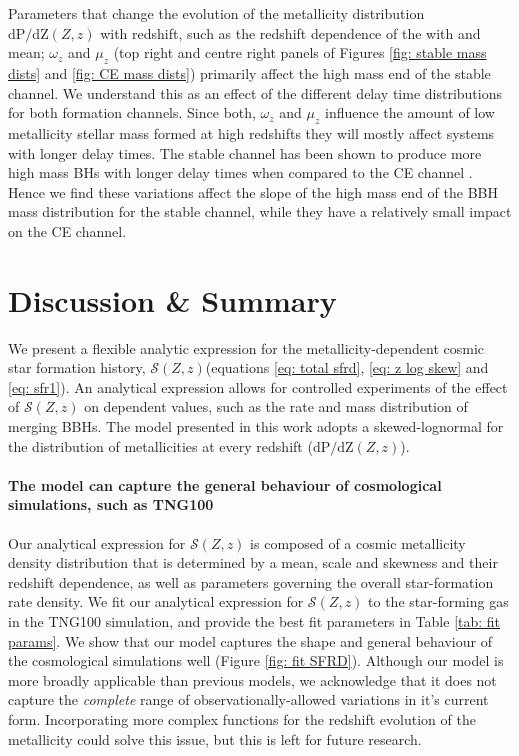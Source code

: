 \documentclass[twocolumn]{aastex631}
\newcommand{\SFRDzZ}{\ensuremath{\mathcal{S}(Z,z)}\xspace}
\newcommand{\dpdZ}{\ensuremath{\mathrm{dP/dZ}(Z,z)}\xspace}
\begin{document}
Parameters that change the evolution of the metallicity distribution \dpdZ with redshift, such as the redshift dependence of the with and mean; $\omega_z$ and $\mu_z$ (top right and centre right panels of Figures \ref{fig: stable mass dists} and \ref{fig: CE mass dists}) primarily affect the high mass end of the stable channel. 
We understand this as an effect of the different delay time distributions for both formation channels. Since both, $\omega_z$ and $\mu_z$ influence the amount of low metallicity stellar mass formed at high redshifts they will mostly affect systems with longer delay times. The stable channel has been shown to produce more high mass BHs with longer delay times when compared to the CE channel \citep{vanson+2022, Briel+2022}. 
Hence we find these variations affect the slope of the high mass end of the BBH mass distribution for the stable channel, while they have a relatively small impact on the CE channel.



\section{Discussion \& Summary \label{sec: summary}}
We present a flexible analytic expression for the metallicity-dependent cosmic star formation history, \SFRDzZ (equations \ref{eq: total sfrd}, \ref{eq: z log skew} and \ref{eq: sfr1}). An analytical expression allows for controlled experiments of the effect of \SFRDzZ on dependent values, such as the rate and mass distribution of merging BBHs. The model presented in this work adopts a skewed-lognormal for the distribution of metallicities at every redshift (\dpdZ). 

\paragraph{The model can capture the general behaviour of cosmological simulations, such as TNG100}
Our analytical expression for \SFRDzZ is composed of a cosmic metallicity density distribution that is determined by a mean, scale and skewness and their redshift dependence, as well as parameters governing the overall star-formation rate density. We fit our analytical expression for \SFRDzZ to the star-forming gas in the TNG100 simulation, and provide the best fit parameters in Table \ref{tab: fit params}. 
We show that our model captures the shape and general behaviour of the cosmological simulations well (Figure \ref{fig: fit SFRD}). 
Although our model is more broadly applicable than previous models, we acknowledge that it does not capture the \textit{complete} range of observationally-allowed variations in it's current form. Incorporating more complex functions for the redshift evolution of the metallicity could solve this issue, but this is left for future research.    
\end{document}
